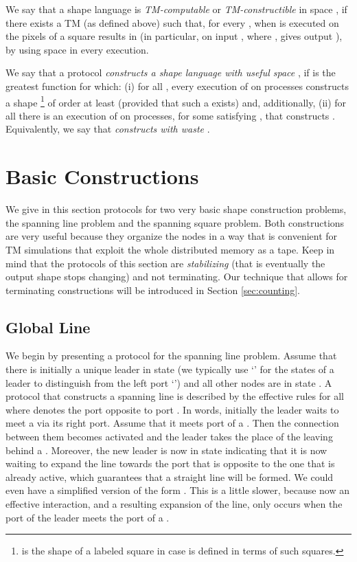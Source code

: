 \documentclass[oribibl, 11pt]{llncs}
\begin{document}
\begin{definition} \label{def:computable}
We say that a shape language  is \emph{TM-computable} or \emph{TM-constructible} in space , if there exists a TM  (as defined above) such that, for every , when  is executed on the pixels of a  square results in  (in particular, on input , where ,  gives output ), by using space  in every execution.
\end{definition}

\begin{definition}
We say that a protocol  \emph{constructs a shape language  with useful space }, if  is the greatest function for which: (i) for all , every execution of  on  processes constructs a shape  \footnote{ is the shape of a labeled square  in case  is defined in terms of such squares.} of order at least  (provided that such a  exists) and, additionally, (ii) for all  there is an execution of  on  processes, for some  satisfying , that constructs . Equivalently, we say that \emph{ constructs  with waste }.
\end{definition}

\section{Basic Constructions}
\label{sec:basic-con}

We give in this section protocols for two very basic shape construction problems, the spanning line problem and the spanning square problem. Both constructions are very useful because they organize the nodes in a way that is convenient for TM simulations that exploit the whole distributed memory as a tape. Keep in mind that the protocols of this section are \emph{stabilizing} (that is eventually the output shape stops changing) and not terminating. Our technique that allows for terminating constructions will be introduced in Section \ref{sec:counting}.

\subsection{Global Line}

We begin by presenting a protocol for the spanning line problem. Assume that there is initially a unique leader in state  (we typically use `' for the states of a leader to distinguish from the left port `') and all other nodes are in state . A protocol that constructs a spanning line is described by the effective rules  for all  where  denotes the port opposite to port . In words, initially the leader waits to meet a  via its right port. Assume that it meets port  of a . Then the connection between them becomes activated and the leader takes the place of the  leaving behind a . Moreover, the new leader is now in state  indicating that it is now waiting to expand the line towards the port that is opposite to the one that is already active, which guarantees that a straight line will be formed. We could even have a simplified version of the form . This is a little slower, because now an effective interaction, and a resulting expansion of the line, only occurs when the  port of the leader meets the  port of a .
\end{document}
